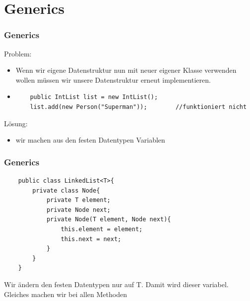\section{Generics}


\begin{frame}[fragile] %
\frametitle{Generics}
Problem:
\begin{itemize}
    \item  Wenn wir eigene Datenstruktur nun mit neuer eigener Klasse verwenden wollen müssen wir unsere Datenstruktur erneut implementieren. 
    \item
    \begin{lstlisting}
    public IntList list = new IntList();
    list.add(new Person("Superman"));        //funktioniert nicht
    \end{lstlisting}
\end{itemize}
Lösung:
\begin{itemize}
    \item wir machen aus den festen Datentypen Variablen
\end{itemize}
\end{frame}

\begin{frame}[fragile]
\frametitle{Generics}
\begin{lstlisting}
    public class LinkedList<T>{
        private class Node{
            private T element;
            private Node next;
            private Node(T element, Node next){
                this.element = element;
                this.next = next;
            }
        } 
    }
\end{lstlisting}
Wir ändern den festen Datentypen nur auf T. Damit wird dieser variabel. Gleiches machen wir bei allen Methoden
\end{frame}

